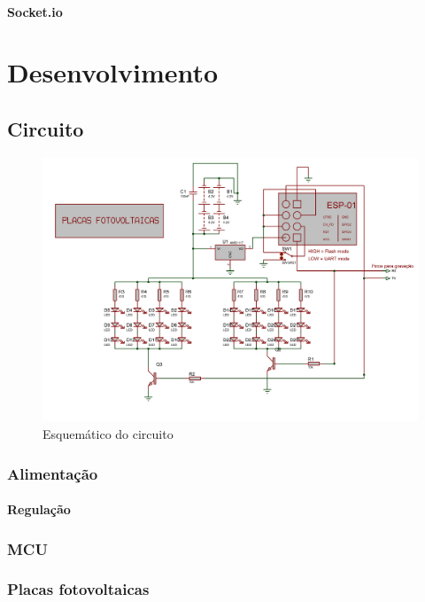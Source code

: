 \documentclass[
12pt,				%
openany,			%
twoside,			%
a4paper,			%
english,			%
french,				%
spanish,			%
brazil,				%
]{abntex2}
\begin{document}
\subsection{Socket.io}


\part{Desenvolvimento}
\chapter{Circuito}
\begin{figure}[ht!]
    \includegraphics[width=450pt]{images/circuit.png}
    \caption{Esquemático do circuito}
\end{figure}

\section{Alimentação}
\subsection{Regulação}
\section{MCU}
\section{Placas fotovoltaicas}
\end{document}
